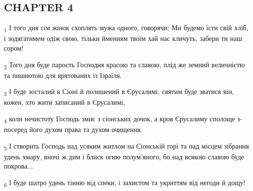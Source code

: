 \subsection{CHAPTER 4}
\begin{tcolorbox}
\textsubscript{1} І того дня сім жінок схоплять мужа одного, говорячи: Ми будемо їсти свій хліб, і зодягатимем одіж свою, тільки йменням твоїм хай нас кличуть, забери ти наш сором!
\end{tcolorbox}
\begin{tcolorbox}
\textsubscript{2} Того дня буде парость Господня красою та славою, плід же земний величністю та пишнотою для врятованих із Ізраїля.
\end{tcolorbox}
\begin{tcolorbox}
\textsubscript{3} І буде зосталий в Сіоні й полишений в Єрусалимі, святим буде зватися він, кожен, хто жити записаний в Єрусалимі,
\end{tcolorbox}
\begin{tcolorbox}
\textsubscript{4} коли нечистоту Господь змиє з сіонських дочок, а кров Єрусалиму сполоще з-посеред його духом права та духом очищення.
\end{tcolorbox}
\begin{tcolorbox}
\textsubscript{5} І створить Господь над усяким житлом на Сіонській горі та над місцем зібрання удень хмару, вночі ж дим і блиск огню полум'яного, бо над всякою славою буде покрова...
\end{tcolorbox}
\begin{tcolorbox}
\textsubscript{6} І буде шатро удень тінню від спеки, і захистом та укриттям від негоди й дощу!
\end{tcolorbox}
